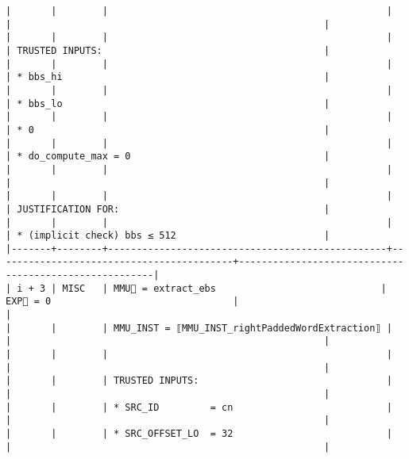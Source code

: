 \documentclass[varwidth=\maxdimen,margin=0.5cm,multi={verbatim}]{standalone}
\begin{document}
\begin{verbatim}
|       |        |                                                 |                                          |                                                       |
|       |        |                                                 |                                          | TRUSTED INPUTS:                                       |
|       |        |                                                 |                                          | * bbs_hi                                              |
|       |        |                                                 |                                          | * bbs_lo                                              |
|       |        |                                                 |                                          | * 0                                                   |
|       |        |                                                 |                                          | * do_compute_max = 0                                  |
|       |        |                                                 |                                          |                                                       |
|       |        |                                                 |                                          | JUSTIFICATION FOR:                                    |
|       |        |                                                 |                                          | * (implicit check) bbs ≤ 512                          |
|-------+--------+-------------------------------------------------+------------------------------------------+-------------------------------------------------------|
| i + 3 | MISC   | MMU🏴 = extract_ebs                             | EXP🏴 = 0                                |                                                       |
|       |        | MMU_INST = ⟦MMU_INST_rightPaddedWordExtraction⟧ |                                          |                                                       |
|       |        |                                                 |                                          |                                                       |
|       |        | TRUSTED INPUTS:                                 |                                          |                                                       |
|       |        | * SRC_ID         = cn                           |                                          |                                                       |
|       |        | * SRC_OFFSET_LO  = 32                           |                                          |                                                       |

\end{verbatim}
\end{document}

